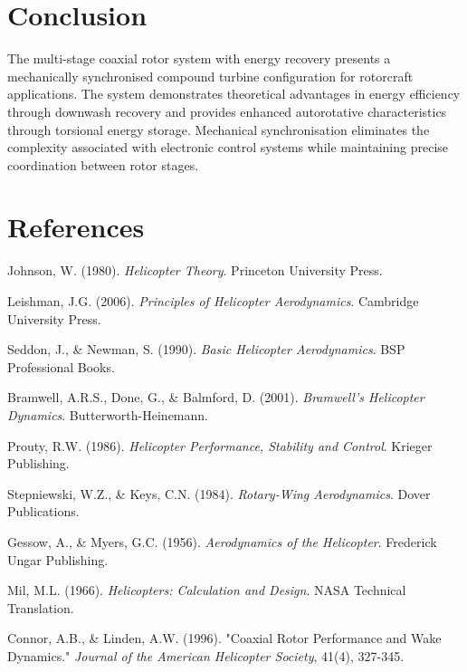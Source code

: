 \documentclass[12pt,a4paper]{article}
\begin{document}
\section{Conclusion}

The multi-stage coaxial rotor system with energy recovery presents a mechanically synchronised compound turbine configuration for rotorcraft applications. The system demonstrates theoretical advantages in energy efficiency through downwash recovery and provides enhanced autorotative characteristics through torsional energy storage. Mechanical synchronisation eliminates the complexity associated with electronic control systems while maintaining precise coordination between rotor stages.

\section{References}

\begin{thebibliography}{9}

Johnson, W. (1980). \emph{Helicopter Theory}. Princeton University Press.

Leishman, J.G. (2006). \emph{Principles of Helicopter Aerodynamics}. Cambridge University Press.

Seddon, J., \& Newman, S. (1990). \emph{Basic Helicopter Aerodynamics}. BSP Professional Books.

Bramwell, A.R.S., Done, G., \& Balmford, D. (2001). \emph{Bramwell's Helicopter Dynamics}. Butterworth-Heinemann.

Prouty, R.W. (1986). \emph{Helicopter Performance, Stability and Control}. Krieger Publishing.

Stepniewski, W.Z., \& Keys, C.N. (1984). \emph{Rotary-Wing Aerodynamics}. Dover Publications.

Gessow, A., \& Myers, G.C. (1956). \emph{Aerodynamics of the Helicopter}. Frederick Ungar Publishing.

Mil, M.L. (1966). \emph{Helicopters: Calculation and Design}. NASA Technical Translation.

Connor, A.B., \& Linden, A.W. (1996). "Coaxial Rotor Performance and Wake Dynamics." \emph{Journal of the American Helicopter Society}, 41(4), 327-345.

\end{thebibliography}
\end{document}
